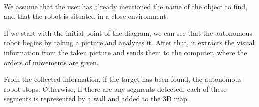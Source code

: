 \documentclass[12pt]{report}
\begin{document}
\paragraph{}
We assume that the user has already mentioned the name of the object to find, and that the robot is situated in a close environment.

If we start with the initial point of the diagram, we can see that the autonomous robot begins by taking a picture and analyzes it. After that, it extracts the visual information from the taken picture and sends them to the computer, where the orders of movements are given. 

From the collected information, if the target has been found, the autonomous robot stops. Otherwise, If there are any segments detected, each of these segments is represented by a wall and added to the 3D map.
\end{document}
